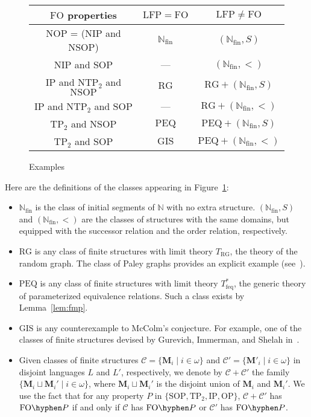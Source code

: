 \documentclass{lmcs}
\newcommand{\LFP}{\mathrm{LFP}}
\newcommand{\FO}{\mathrm{FO}}
\newcommand{\FOP}[1]{\FO\hyphen#1}
\newcommand{\OP}{\mathrm{OP}}
\newcommand{\NOP}{\mathrm{NOP}}
\newcommand{\IP}{\mathrm{IP}}
\newcommand{\NIP}{\mathrm{NIP}}
\newcommand{\SOP}{\mathrm{SOP}}
\newcommand{\NSOP}{\mathrm{NSOP}}
\newcommand{\TPT}{\mathrm{TP}_2}
\newcommand{\NTPT}{\mathrm{NTP}_2}
\newcommand{\RG}{\mathrm{RG}}
\newcommand{\PEQ}{\mathrm{PEQ}}
\newcommand{\GIS}{\mathrm{GIS}}
\newcommand{\M}{\mathbf{M}}
\newcommand{\fin}{\mathrm{fin}}
\theoremstyle{thmC}
\begin{document}
\begin{figure}[ht]
\caption{Examples}
\label{fig:examples} \centering

\begin{tabular}{|c||c|c|}
\hline $\FO$ properties & $\LFP=\FO$ & $\LFP\neq \FO$\\
\hline\hline $\NOP$ = ($\NIP$ and $\NSOP$) & $\mathbb{N}_\fin$ & $(\mathbb{N}_\fin,S)$\\
\hline $\NIP$ and $\SOP$ & --- & $(\mathbb{N}_\fin,<)$\\
\hline $\IP$ and $\NTPT$ and $\NSOP$ & $\RG$ & $\RG+(\mathbb{N}_\fin,S)$\\
\hline $\IP$ and $\NTPT$ and $\SOP$ & --- & $\RG+(\mathbb{N}_\fin,<)$\\
\hline $\TPT$ and $\NSOP$ & $\PEQ$ & $\PEQ+(\mathbb{N}_\fin,S)$\\
\hline $\TPT$ and $\SOP$ & $\GIS$ & $\PEQ+(\mathbb{N}_\fin,<)$
\\\hline \end{tabular}
\end{figure}


Here are the definitions of the classes appearing in Figure~\ref{fig:examples}: 
\begin{itemize}
\item $\mathbb{N}_\fin$ is the class of initial segments of $\mathbb{N}$ with no extra
structure. $(\mathbb{N}_\fin,S)$ and $(\mathbb{N}_\fin,<)$ are the classes of structures
with the same domains, but equipped with the successor relation and
the order relation, respectively. 
\item $\RG$ is any class of finite structures with limit theory $T_{\RG}$,
the theory of the random graph. The class of Paley graphs provides an explicit example (see~\cite{BEH}). 
\item $\PEQ$ is any class of finite structures with limit theory
$T_{\mathrm{feq}}^{*}$, the generic theory of parameterized equivalence
relations. Such a class exists by Lemma~\ref{lem:fmp}.  
\item $\GIS$ is any counterexample to McColm's conjecture. For example,
one of the classes of finite structures devised by Gurevich, Immerman,
and Shelah in~\cite{GIS}. 
\item Given classes of finite structures $\mathcal{C}=\{\M_{i}\mid i\in\omega\}$
and $\mathcal{C}'=\{\M'_{i}\mid i\in\omega\}$ in disjoint
languages $L$ and $L'$, respectively, we denote by $\mathcal{C}+\mathcal{C}'$
the family $\{\M_{i}\sqcup \M_{i}'\mid i\in\omega\}$,
where $\M_{i}\sqcup \M_{i}'$ is the disjoint union
of $\M_{i}$ and $\M_{i}'$. We use the fact that
for any property $P$ in $\{\SOP,\TPT,\IP,\OP\}$,
$\mathcal{C}+\mathcal{C}'$ has $\FOP{P}$ if and only if $\mathcal{C}$
has $\FOP{P}$ or $\mathcal{C}'$ has $\FOP{P}$.
\end{itemize}
\end{document}

